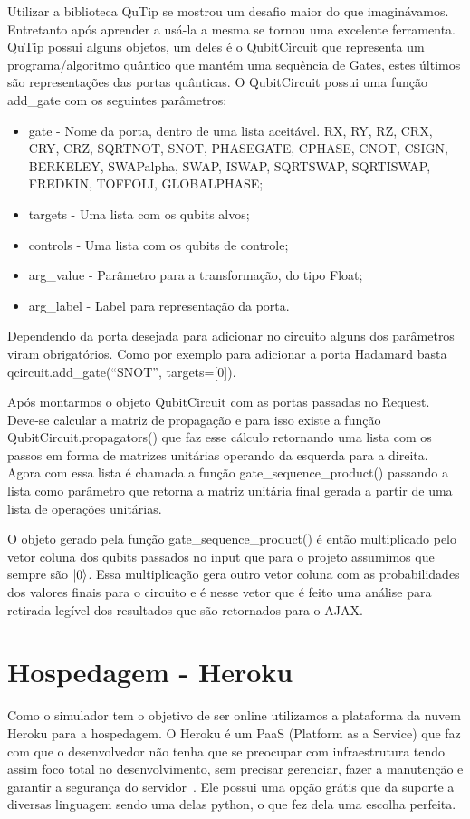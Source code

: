 \documentclass[a4paper, 12pt, oneside]{book}
\begin{document}
Utilizar a biblioteca QuTip se mostrou um desafio maior do que imaginávamos. Entretanto após aprender a usá-la a mesma se tornou uma excelente ferramenta. QuTip possui alguns objetos, um deles é o QubitCircuit que representa um programa/algoritmo quântico que mantém uma sequência de Gates, estes últimos são representações das portas quânticas. O QubitCircuit possui uma função add\_gate com os seguintes parâmetros:
\begin{itemize}
\item gate - Nome da porta, dentro de uma lista aceitável. RX, RY, RZ, CRX, CRY, CRZ, SQRTNOT, SNOT, PHASEGATE, CPHASE, CNOT, CSIGN, BERKELEY, SWAPalpha, SWAP, ISWAP, SQRTSWAP, SQRTISWAP, FREDKIN, TOFFOLI, GLOBALPHASE;
\item targets - Uma lista com os qubits alvos;
\item controls - Uma lista com os qubits de controle;
\item arg\_value - Parâmetro para a transformação, do tipo Float;
\item arg\_label - Label para representação da porta.
\end{itemize}
Dependendo da porta desejada para adicionar no circuito alguns dos parâmetros viram obrigatórios. Como por exemplo para adicionar a porta Hadamard basta qcircuit.add\_gate(``SNOT'', targets=[0]).

Após montarmos o objeto QubitCircuit com as portas passadas no Request. Deve-se calcular a matriz de propagação e para isso existe a função QubitCircuit.propagators() que faz esse cálculo retornando uma lista com os passos em forma de matrizes unitárias operando da esquerda para a direita. Agora com essa lista é chamada a função gate\_sequence\_product() passando a lista como parâmetro que retorna a matriz unitária final gerada a partir de uma lista de operações unitárias.

O objeto gerado pela função gate\_sequence\_product() é então multiplicado pelo vetor coluna dos qubits passados no input que para o projeto assumimos que sempre são $\ket{0}$. Essa multiplicação gera outro vetor coluna com as probabilidades dos valores finais para o circuito e é nesse vetor que é feito uma análise para retirada legível dos resultados que são retornados para o AJAX.

\section{Hospedagem - Heroku}

Como o simulador tem o objetivo de ser online utilizamos a plataforma da nuvem Heroku para a hospedagem. O Heroku é um PaaS (Platform as a Service) que faz com que o desenvolvedor não tenha que se preocupar com infraestrutura tendo assim foco total no desenvolvimento, sem precisar gerenciar, fazer a manutenção e garantir a segurança do servidor~\cite{heroku}. Ele possui uma opção grátis que da suporte a diversas linguagem sendo uma delas python, o que fez dela uma escolha perfeita.
\end{document}

